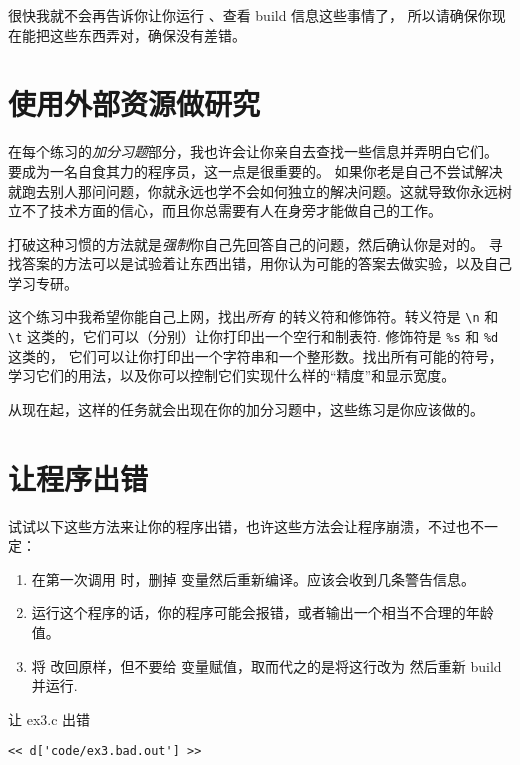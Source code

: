 很快我就不会再告诉你让你运行  、查看 build 信息这些事情了， 所以请确保你现在能把这些东西弄对，确保没有差错。

\section{使用外部资源做研究}

在每个练习的\emph{加分习题}部分，我也许会让你亲自去查找一些信息并弄明白它们。 要成为一名自食其力的程序员，这一点是很重要的。 如果你老是自己不尝试解决就跑去别人那问问题，你就永远也学不会如何独立的解决问题。这就导致你永远树立不了技术方面的信心，而且你总需要有人在身旁才能做自己的工作。

打破这种习惯的方法就是\emph{强制}你自己先回答自己的问题，然后确认你是对的。 寻找答案的方法可以是试验着让东西出错，用你认为可能的答案去做实验，以及自己学习专研。

这个练习中我希望你能自己上网，找出\emph{所有}  的转义符和修饰符。转义符是
\verb|\n| 和 \verb|\t| 这类的，它们可以（分别）让你打印出一个空行和制表符. 修饰符是 \verb|%s| 和 \verb|%d| 这类的， 它们可以让你打印出一个字符串和一个整形数。找出所有可能的符号， 学习它们的用法，以及你可以控制它们实现什么样的“精度”和显示宽度。

从现在起，这样的任务就会出现在你的加分习题中，这些练习是你应该做的。

\section{让程序出错}

试试以下这些方法来让你的程序出错，也许这些方法会让程序崩溃，不过也不一定：

\begin{enumerate}
\item 在第一次调用  时，删掉  变量然后重新编译。应该会收到几条警告信息。
\item 运行这个程序的话，你的程序可能会报错，或者输出一个相当不合理的年龄值。
\item 将  改回原样，但不要给  变量赋值，取而代之的是将这行改为  然后重新 build 并运行.
\end{enumerate}


\begin{Terminal}{让 ex3.c 出错}
\begin{lstlisting}
<< d['code/ex3.bad.out'] >>
\end{lstlisting}
\end{Terminal}

